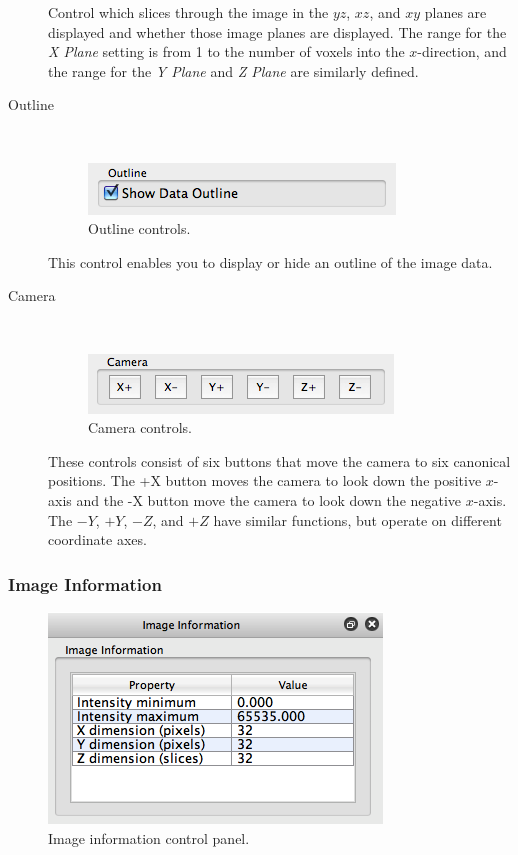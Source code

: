\documentclass[11pt,titlepage,twoside]{article}
\begin{document}
\begin{description}
  Control which slices through the image in the $yz$, $xz$, and $xy$ planes are displayed and whether those image planes are displayed. The range for the \emph{X Plane} setting is from 1 to the number of voxels into the $x$-direction, and the range for the \emph{Y Plane} and \emph{Z Plane} are similarly defined.

  \item[Outline] \hfill \\
  
  \begin{figure}[h]
    \centering
    \includegraphics[scale=0.5]{images/OutlineControls}
    \caption{Outline controls.}
    \label{fig:OutlineControls}
  \end{figure}
  
  
  This control enables you to display or hide an outline of the image data.

  \item[Camera] \hfill \\
  
  \begin{figure}[h]
    \centering
    \includegraphics[scale=0.5]{images/CameraControls}
    \caption{Camera controls.}
    \label{fig:CameraControls}
  \end{figure}
  
  These controls consist of six buttons that move the camera to six canonical positions. The +X button moves the camera to look down the positive $x$-axis and the -X button move the camera to look down the negative $x$-axis. The $-Y$, $+Y$, $-Z$, and $+Z$ have similar functions, but operate on different coordinate axes.

\end{description}

\subsubsection{Image Information}

  \begin{figure}[h]
    \centering
    \includegraphics[scale=0.5]{images/ImageInformationControlPanel}
    \caption{Image information control panel.}
    \label{fig:ImageInformationControlPanel}
  \end{figure}
\end{document}
